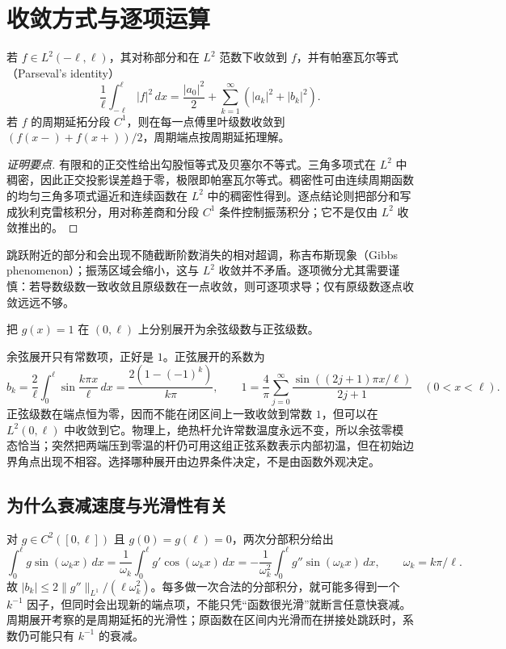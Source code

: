 \section{收敛方式与逐项运算}
\begin{theorem}[傅里叶收敛的两种基本形式]
若 $f\in L^2(-\ell,\ell)$，其对称部分和在 $L^2$ 范数下收敛到 $f$，并有帕塞瓦尔等式（Parseval's identity）
\[
 \frac1\ell\int_{-\ell}^\ell |f|^2\,dx
 =\frac{|a_0|^2}{2}+\sum_{k=1}^\infty(|a_k|^2+|b_k|^2).
\]
若 $f$ 的周期延拓分段 $C^1$，则在每一点傅里叶级数收敛到 $(f(x-)+f(x+))/2$，周期端点按周期延拓理解。
\end{theorem}
\begin{proof}[证明要点]
有限和的正交性给出勾股恒等式及贝塞尔不等式。三角多项式在 $L^2$ 中稠密，因此正交投影误差趋于零，极限即帕塞瓦尔等式。稠密性可由连续周期函数的均匀三角多项式逼近和连续函数在 $L^2$ 中的稠密性得到。逐点结论则把部分和写成狄利克雷核积分，用对称差商和分段 $C^1$ 条件控制振荡积分；它不是仅由 $L^2$ 收敛推出的。
\end{proof}
跳跃附近的部分和会出现不随截断阶数消失的相对超调，称吉布斯现象（Gibbs phenomenon）；振荡区域会缩小，这与 $L^2$ 收敛并不矛盾。逐项微分尤其需要谨慎：若导数级数一致收敛且原级数在一点收敛，则可逐项求导；仅有原级数逐点收敛远远不够。

\begin{example}[同一函数的两种展开]
把 $g(x)=1$ 在 $(0,\ell)$ 上分别展开为余弦级数与正弦级数。
\end{example}
\begin{solve}
余弦展开只有常数项，正好是 $1$。正弦展开的系数为
\[
 b_k=\frac2\ell\int_0^\ell\sin\frac{k\pi x}{\ell}\,dx
 =\frac{2(1-(-1)^k)}{k\pi},\qquad
 1=\frac4\pi\sum_{j=0}^\infty\frac{\sin((2j+1)\pi x/\ell)}{2j+1}
 \quad(0<x<\ell).
\]
正弦级数在端点恒为零，因而不能在闭区间上一致收敛到常数 $1$，但可以在 $L^2(0,\ell)$ 中收敛到它。物理上，绝热杆允许常数温度永远不变，所以余弦零模态恰当；突然把两端压到零温的杆仍可用这组正弦系数表示内部初温，但在初始边界角点出现不相容。选择哪种展开由边界条件决定，不是由函数外观决定。
\end{solve}

\subsection{为什么衰减速度与光滑性有关}
对 $g\in C^2([0,\ell])$ 且 $g(0)=g(\ell)=0$，两次分部积分给出
\[
 \int_0^\ell g\sin(\omega_kx)\,dx
 =\frac1{\omega_k}\int_0^\ell g'\cos(\omega_kx)\,dx
 =-\frac1{\omega_k^2}\int_0^\ell g''\sin(\omega_kx)\,dx,
 \qquad \omega_k=k\pi/\ell.
\]
故 $|b_k|\le 2\|g''\|_{L^1}/(\ell\omega_k^2)$。每多做一次合法的分部积分，就可能多得到一个 $k^{-1}$ 因子，但同时会出现新的端点项，不能只凭“函数很光滑”就断言任意快衰减。周期展开考察的是周期延拓的光滑性；原函数在区间内光滑而在拼接处跳跃时，系数仍可能只有 $k^{-1}$ 的衰减。

